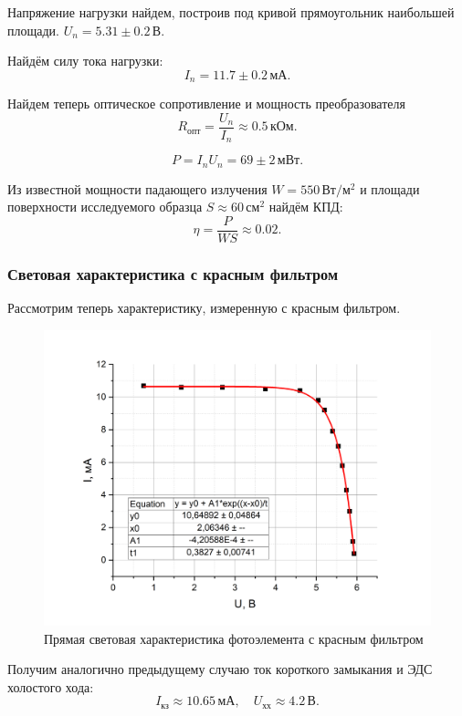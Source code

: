 \documentclass[a4paper,12pt]{article} %
\begin{document}
Напряжение нагрузки найдем, построив под кривой прямоугольник наибольшей площади. $U_n = 5.31 \pm 0.2 \, \text{В}$.

Найдём силу тока нагрузки:
\[
I_n = 11.7 \pm 0.2 \, \text{мА}. 
\]

Найдем теперь оптическое сопротивление и мощность преобразователя
\[
R_{\text{опт}} = \frac{U_n}{I_n} \approx 0.5 \, \text{кОм}. 
\]

\[
P = I_n U_n = 69 \pm 2 \, \text{мВт}. 
\]

Из известной мощности падающего излучения $W = 550 \, \text{Вт}/\text{м}^2$ и площади поверхности исследуемого образца $S \approx 60 \, \text{см}^2$ найдём КПД:
\[
\eta = \frac{P}{W S} \approx 0.02.
\]

\subsubsection{Световая характеристика с красным фильтром}


Рассмотрим теперь характеристику, измеренную с красным фильтром.

\begin{figure}[h!]
    \centering
    \includegraphics[scale=0.5]{БОЛЬШОЙ Ф-Т прямая световая с фильтром.png}
    \caption{Прямая световая характеристика фотоэлемента с красным фильтром}
\end{figure}

Получим аналогично предыдущему случаю ток короткого замыкания и ЭДС холостого хода:
\[I_{\text{кз}} \approx 10.65 \, \text{мА}, \quad U_{\text{хх}} \approx 4.2 \, \text{В}.
\]
\end{document}

